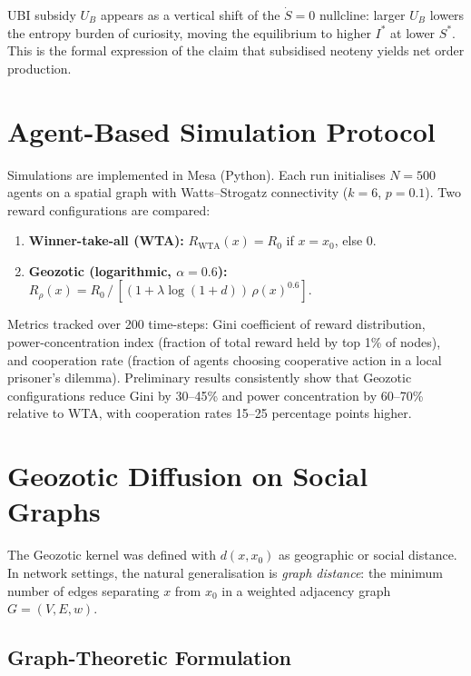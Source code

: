 \documentclass[12pt,a4paper]{article}
\theoremstyle{definition}
\begin{document}
\noindent UBI subsidy $U_B$ appears as a vertical shift of the $\dot{S}=0$
nullcline: larger $U_B$ lowers the entropy burden of curiosity, moving the
equilibrium to higher $I^*$ at lower $S^*$.  This is the formal expression
of the claim that subsidised neoteny yields net order production.

\section{Agent-Based Simulation Protocol}
\label{app:agentbased}

Simulations are implemented in Mesa (Python).  Each run initialises $N = 500$
agents on a spatial graph with Watts--Strogatz connectivity ($k = 6$,
$p = 0.1$).  Two reward configurations are compared:

\begin{enumerate}[leftmargin=*]
  \item \textbf{Winner-take-all (WTA):} $R_{\mathrm{WTA}}(x) = R_0$ if
    $x = x_0$, else $0$.
  \item \textbf{Geozotic (logarithmic, $\alpha = 0.6$):}
    $R_\rho(x) = R_0\,/\,[(1 + \lambda \log(1+d))\,\rho(x)^{0.6}]$.
\end{enumerate}

Metrics tracked over 200 time-steps: Gini coefficient of reward distribution,
power-concentration index (fraction of total reward held by top 1\% of nodes),
and cooperation rate (fraction of agents choosing cooperative action in a
local prisoner's dilemma).  Preliminary results consistently show that
Geozotic configurations reduce Gini by 30--45\% and power concentration by
60--70\% relative to WTA, with cooperation rates 15--25 percentage points
higher.

\section{Geozotic Diffusion on Social Graphs}
\label{app:socialgraph}

The Geozotic kernel was defined with $d(x, x_0)$ as geographic or social
distance.  In network settings, the natural generalisation is \emph{graph
distance}: the minimum number of edges separating $x$ from $x_0$ in a
weighted adjacency graph $G = (V, E, w)$.

\subsection*{Graph-Theoretic Formulation}
\end{document}
